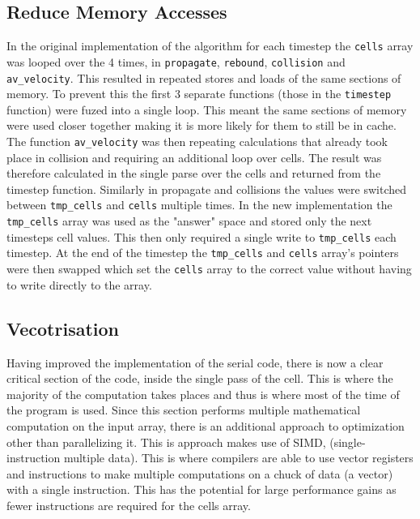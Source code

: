 \documentclass{article}
\begin{document}
\begin{multicols}{2}
\subsection{Reduce Memory Accesses}

In the original implementation of the algorithm for each timestep the
\verb|cells| array was looped over the 4 times, in \verb|propagate|,
\verb|rebound|, \verb|collision| and \verb|av_velocity|. This resulted in
repeated stores and loads of the same sections of memory. To prevent this the
first 3 separate functions (those in the \verb|timestep| function) were fuzed
into a single loop. This meant the same sections of memory were used closer
together making it is more likely for them to still be in cache. The function
\verb|av_velocity| was then repeating calculations that already took place in
collision and requiring an additional loop over cells. The result was therefore
calculated in the single parse over the cells and returned from the timestep
function. Similarly in propagate and collisions the values were switched
between \verb|tmp_cells| and \verb|cells| multiple times. In the new
implementation the \verb|tmp_cells| array was used as the "answer" space and
stored only the next timesteps cell values. This then only required a single
write to \verb|tmp_cells| each timestep. At the end of the timestep the
\verb|tmp_cells| and \verb|cells| array's pointers were then swapped which set
the \verb|cells| array to the correct value without having to write directly to
the array.

\subsection{Vecotrisation}

Having improved the implementation of the serial code, there is now a clear
critical section of the code, inside the single pass of the cell. This is where
the majority of the computation takes places and thus is where most of the time
of the program is used. Since this section performs multiple mathematical
computation on the input array, there is an additional approach to optimization
other than parallelizing it. This is approach makes use of SIMD,
(single-instruction multiple data). This is where compilers are able to use
vector registers and instructions to make multiple computations on a chuck of
data (a vector) with a single instruction. This has the potential for large
performance gains as fewer instructions are required for the cells array.


\end{multicols}
\end{document}
